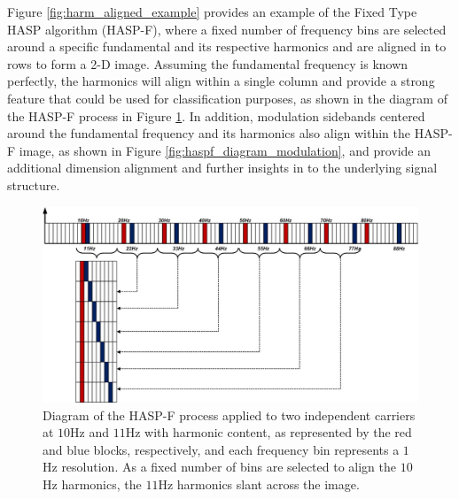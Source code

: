 Figure \ref{fig:harm_aligned_example} provides an example of the Fixed Type HASP algorithm (HASP-F), where a fixed number of frequency bins are selected around a specific fundamental and its respective harmonics and are aligned in to rows to form a 2-D image.  Assuming the fundamental frequency is known perfectly, the harmonics will align within a single column and provide a strong feature that could be used for classification purposes, as shown in the diagram of the HASP-F process in Figure \ref{fig:haspf_diagram_independent}.  In addition, modulation sidebands centered around the fundamental frequency and its harmonics also align within the HASP-F image, as shown in Figure \ref{fig:haspf_diagram_modulation}, and provide an additional dimension alignment and further insights in to the underlying signal structure.

\begin{figure}[tb]
	\includegraphics[width=\textwidth]{./misc_graphics/haspf_diagram_independent.jpg}
	\centering
	\caption{Diagram of the HASP-F process applied to two independent carriers at $10$Hz and $11$Hz with harmonic content, as represented by the red and blue blocks, respectively, and each frequency bin represents a $1$Hz resolution.  As a fixed number of bins are selected to align the $10$Hz harmonics, the $11$Hz harmonics slant across the image.}
	\label{fig:haspf_diagram_independent}
\end{figure}

